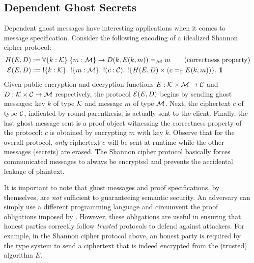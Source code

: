 \subsection{Dependent Ghost Secrets}
Dependent ghost messages have interesting applications when it comes to message specification.
Consider the following encoding of a idealized Shannon cipher protocol:
\begin{align*}
  H(E, D) &:= \forall \{k : \mcK\}\;\{m : \mcM\} \rightarrow D(k, E(k, m)) =_{\mcM} m
\qquad\text{(correctness property)}
  \\
  \mcE(E, D) &:=\ !\{k : \mcK\}.\ !\{m : \mcM\}.\ !(c : \mcC).\ !\{H(E,D) \times (c =_\mcC E(k, m))\}.\ \End
\end{align*}
Given public encryption and decryption functions
$E: \mathcal{K} \times \mathcal{M} \rightarrow \mathcal{C}$ and
$D: \mathcal{K} \times \mathcal{C} \rightarrow \mathcal{M}$ respectively, the protocol $\mathcal{E}(E,D)$
begins by sending ghost messages: key $k$ of type $\mathcal{K}$ and message $m$ of type
$\mathcal{M}$.  Next, the ciphertext $c$ of type $\mathcal{C}$, indicated by round
parenthesis, is actually sent to the client. Finally, the last ghost message
sent is a proof object witnessing the correctness property of the
protocol: $c$ is obtained by encrypting $m$ with key $k$.  Observe that for the
overall protocol, \emph{only} ciphertext $c$ will be sent at runtime while the
other messages (secrets) are erased. The Shannon cipher protocol basically
forces communicated messages to always be encrypted and prevents the accidental
leakage of plaintext.

It is important to note that ghost messages and proof specifications, by
themselves, are \emph{not} sufficient to guaranteeing semantic security.
An adversary can simply use a different programming language and circumvent the
proof obligations imposed by \TLLC{}. However, these obligations are useful in
ensuring that honest parties correctly follow \emph{trusted} protocols to defend
against attackers. For example, in the Shannon cipher protocol above, an honest
party is required by the type system to send a ciphertext that is indeed encrypted
from the (trusted) algorithm $E$.

